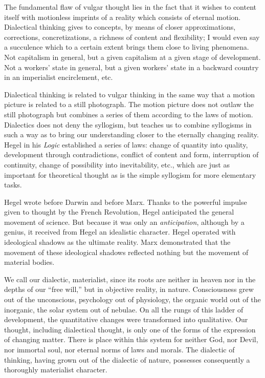 The fundamental flaw of vulgar thought lies in the fact that it wishes to content itself with motionless imprints of a reality which consists of eternal motion. Dialectical thinking gives to concepts, by means of closer approximations, corrections, concretizations, a richness of content and flexibility; I would even say a succulence which to a certain extent brings them close to living phenomena. Not capitalism in general, but a given capitalism at a given stage of development. Not a workers’ state in general, but a given workers’ state in a backward country in an imperialist encirclement, etc.

Dialectical thinking is related to vulgar thinking in the same way that a motion picture is related to a still photograph. The motion picture does not outlaw the still photograph but combines a series of them according to the laws of motion. Dialectics does not deny the syllogism, but teaches us to combine syllogisms in such a way as to bring our understanding closer to the eternally changing reality. Hegel in his \emph{Logic} established a series of laws: change of quantity into quality, development through contradictions, conflict of content and form, interruption of continuity, change of possibility into inevitability, etc., which are just as important for theoretical thought as is the simple syllogism for more elementary tasks.

Hegel wrote before Darwin and before Marx. Thanks to the powerful impulse given to thought by the French Revolution, Hegel anticipated the general movement of science. But because it was only an \emph{anticipation}, although by a genius, it received from Hegel an idealistic character. Hegel operated with ideological shadows as the ultimate reality. Marx demonstrated that the movement of these ideological shadows reflected nothing but the movement of material bodies.

We call our dialectic, materialist, since its roots are neither in heaven nor in the depths of our “free will,” but in objective reality, in nature. Consciousness grew out of the unconscious, psychology out of physiology, the organic world out of the inorganic, the solar system out of nebulae. On all the rungs of this ladder of development, the quantitative changes were transformed into qualitative. Our thought, including dialectical thought, is only one of the forms of the expression of changing matter. There is place within this system for neither God, nor Devil, nor immortal soul, nor eternal norms of laws and morals. The dialectic of thinking, having grown out of the dialectic of nature, possesses consequently a thoroughly materialist character.

